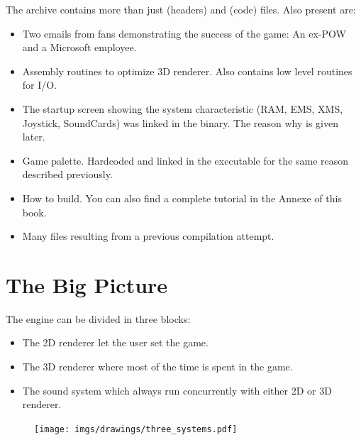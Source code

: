 \documentclass[book.tex]{subfiles}
\begin{document}
The archive contains more than just  (headers) and  (code) files. Also present are:
\begin{itemize}
\item {} Two emails from fans demonstrating the success of the game: An ex-POW and a Microsoft employee.
\item {} Assembly routines to optimize 3D renderer. Also contains low level routines for I/O.
\item {} The startup screen showing the system characteristic (RAM, EMS, XMS, Joystick, SoundCards) was linked in the binary. The reason why is given later.
\item {} Game palette. Hardcoded and linked in the executable for the same reason described previously.
\item {} How to build. You can also find a complete tutorial in the Annexe of this book.
\item Many files resulting from a previous compilation attempt.
\end{itemize}







\section{The Big Picture}
The engine can be divided in three blocks:
\begin{itemize}
\item The 2D renderer let the user set the game.
\item The 3D renderer where most of the time is spent in the game.
\item The sound system which always run concurrently with either 2D or 3D renderer. 
\end{itemize}

\par
\begin{figure}[H]
\centering
 \texttt{[image: imgs/drawings/three\_systems.pdf]}
 \end{figure}
 \par
\end{document}

